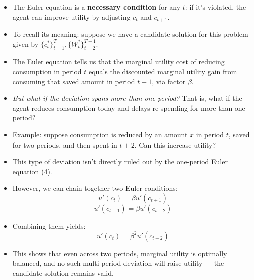 \documentclass[12pt]{article}
\begin{document}
\begin{itemize}
    \item The Euler equation is a \textbf{necessary condition} for any \( t \): if it's violated, the agent can improve utility by adjusting \( c_t \) and \( c_{t+1} \).
    
    \item To recall its meaning: suppose we have a candidate solution for this problem given by \( \{c_t^*\}_{t=1}^T, \{W_t^*\}_{t=2}^{T+1} \).
    
    \item The Euler equation tells us that the marginal utility cost of reducing consumption in period \( t \) equals the discounted marginal utility gain from consuming that saved amount in period \( t+1 \), via factor \( \beta \).

    \item \textit{But what if the deviation spans more than one period?} That is, what if the agent reduces consumption today and delays re-spending for more than one period?

    \item Example: suppose consumption is reduced by an amount \( x \) in period \( t \), saved for two periods, and then spent in \( t+2 \). Can this increase utility?

    \item This type of deviation isn't directly ruled out by the one-period Euler equation (4).

    \item However, we can chain together two Euler conditions:
    \[
    u'(c_t) = \beta u'(c_{t+1})
    \]
    \[
    u'(c_{t+1}) = \beta u'(c_{t+2})
    \]
    \item Combining them yields:
    \[
    u'(c_t) = \beta^2 u'(c_{t+2})
    \]

    \item This shows that even across two periods, marginal utility is optimally balanced, and no such multi-period deviation will raise utility — the candidate solution remains valid.
\end{itemize}
\end{document}
